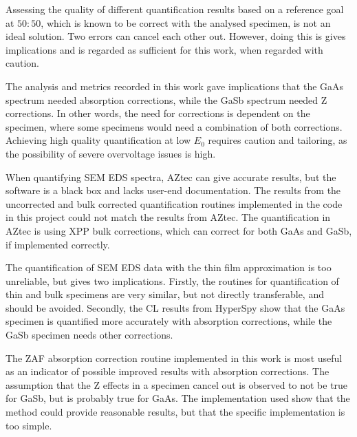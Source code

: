 Assessing the quality of different quantification results based on a reference goal at $50:50$, which is known to be correct with the analysed specimen, is not an ideal solution.
Two errors can cancel each other out.
However, doing this is gives implications and is regarded as sufficient for this work, when regarded with caution.

The analysis and metrics recorded in this work gave implications that the GaAs spectrum needed absorption corrections, while the GaSb spectrum needed Z corrections.
In other words, the need for corrections is dependent on the specimen, where some specimens would need a combination of both corrections.
Achieving high quality quantification at low $E_0$ requires caution and tailoring, as the possibility of severe overvoltage issues is high.

When quantifying SEM EDS spectra, AZtec can give accurate results, but the software is a black box and lacks user-end documentation.
The results from the uncorrected and bulk corrected quantification routines implemented in the code in this project could not match the results from AZtec.
The quantification in AZtec is using XPP bulk corrections, which can correct for both GaAs and GaSb, if implemented correctly.

The quantification of SEM EDS data with the thin film approximation is too unreliable, but gives two implications.
Firstly, the routines for quantification of thin and bulk specimens are very similar, but not directly transferable, and should be avoided.
Secondly, the CL results from HyperSpy show that the GaAs specimen is quantified more accurately with absorption corrections, while the GaSb specimen needs other corrections.

The ZAF absorption correction routine implemented in this work is most useful as an indicator of possible improved results with absorption corrections.
The assumption that the Z effects in a specimen cancel out is observed to not be true for GaSb, but is probably true for GaAs.
The implementation used show that the method could provide reasonable results, but that the specific implementation is too simple.

